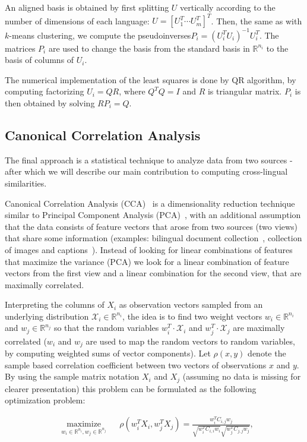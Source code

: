 \documentclass[twoside,11pt]{article}
\newcommand{\RR}{\mathbb{R}}
\begin{document}
An aligned basis is obtained by first splitting $U$ vertically according to the number of dimensions of each language: $U = [U_1^T \cdots U_m^T]^T$. Then, the same as with $k$-means clustering, we compute the pseudoinverses$P_i = (U_i^T U_i)^{-1} U_i^T$. The matrices $P_i$ are used to change the basis from the standard basis in $\RR^{n_i}$ to the basis of columns of $U_i$.

The numerical implementation of the least squares is done by QR algorithm, by computing factorizing $U_i = Q R$, where $Q^TQ = I$ and $R$ is triangular matrix. $P_i$ is then obtained by solving $R P_i = Q$.


\subsection{Canonical Correlation Analysis}
 The final approach is a statistical technique to analyze data from two sources - after which we will describe our main contribution to computing cross-lingual similarities.

 Canonical Correlation Analysis (CCA)~\cite{Hotelling} is a dimensionality reduction technique similar to Principal Component Analysis (PCA)~\cite{Pearson1901On}, with an additional assumption that the data consists of feature vectors that arose from two sources (two views) that share some information (examples: bilingual document collection~\cite{mrpqr}, collection of images and captions~\cite{Hardoon_usingimage}). Instead of looking for linear combinations of features that maximize the variance (PCA) we look for a linear combination of feature vectors from the first view and a linear combination for the second view, that are maximally correlated.

Interpreting the columns of $X_i$ as observation vectors sampled from an underlying distribution $\mathcal{X}_i \in \RR^{n_i}$, the idea is to find two weight vectors $w_i \in \RR^{n_i}$ and $w_j \in \RR^{n_j}$ so that the random variables $w_i^T \cdot \mathcal{X}_i$ and $w_j^T \cdot \mathcal{X}_j$ are maximally correlated ($w_i$ and $w_j$ are used to map the random vectors to random variables, by computing weighted sums of vector components). Let $\rho(x,y)$ denote the sample based correlation coefficient between two vectors of observations $x$ and $y$. By using the sample matrix notation $X_i$ and $X_j$ (assuming no data is missing for clearer presentation) this problem can be formulated as the following optimization problem:

\begin{equation*}
\begin{aligned}
& \underset{w_i \in \RR^{n_i}, w_j \in \RR^{n_j}}{\text{maximize}}
& & \rho(w_i^T X_i , w_j^T X_j) = \frac{w_i^T C_{i,j} w_j}{\sqrt{w_i^T C_{i,i} w_i} \sqrt{w_j^T C_{j,j} w_j}},
\end{aligned}
\end{equation*}
\end{document}
